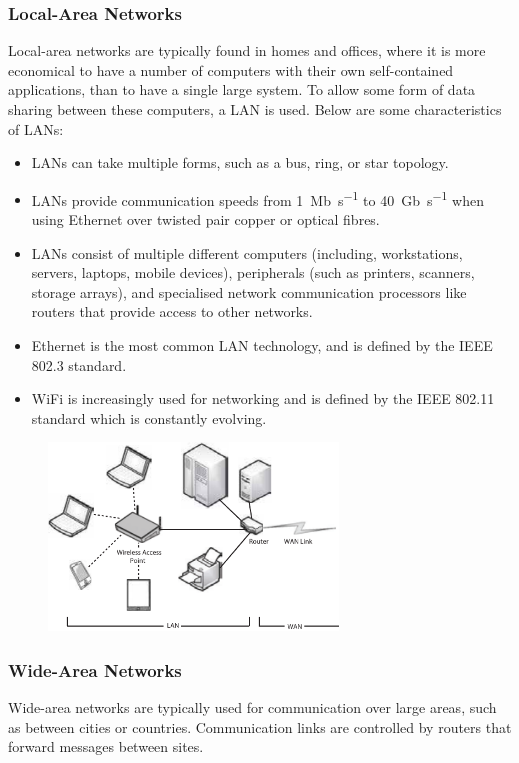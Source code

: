 \documentclass{article}
\begin{document}
\subsubsection{Local-Area Networks}
Local-area networks are typically found in homes and offices, where it
is more economical to have a number of computers with their own
self-contained applications, than to have a single large system. To
allow some form of data sharing between these computers, a LAN is used.
Below are some characteristics of LANs:
\begin{itemize}
    \item LANs can take multiple forms, such as a bus, ring, or star
          topology.
    \item LANs provide communication speeds from \qty{1}{Mb.s^{-1}} to
          \qty{40}{Gb.s^{-1}} when using Ethernet over twisted pair
          copper or optical fibres.
    \item LANs consist of multiple different computers (including,
          workstations, servers, laptops, mobile devices), peripherals
          (such as printers, scanners, storage arrays), and specialised
          network communication processors like routers that provide
          access to other networks.
    \item Ethernet is the most common LAN technology, and is defined by
          the IEEE 802.3 standard.
    \item WiFi is increasingly used for networking and is defined by
          the IEEE 802.11 standard which is constantly evolving.
\end{itemize}
\begin{figure}[H]
    \centering
    \includegraphics[height = 5cm]{figures/LAN.pdf}
\end{figure}
\subsubsection{Wide-Area Networks}
Wide-area networks are typically used for communication over large
areas, such as between cities or countries. Communication links are
controlled by routers that forward messages between sites.
\end{document}
